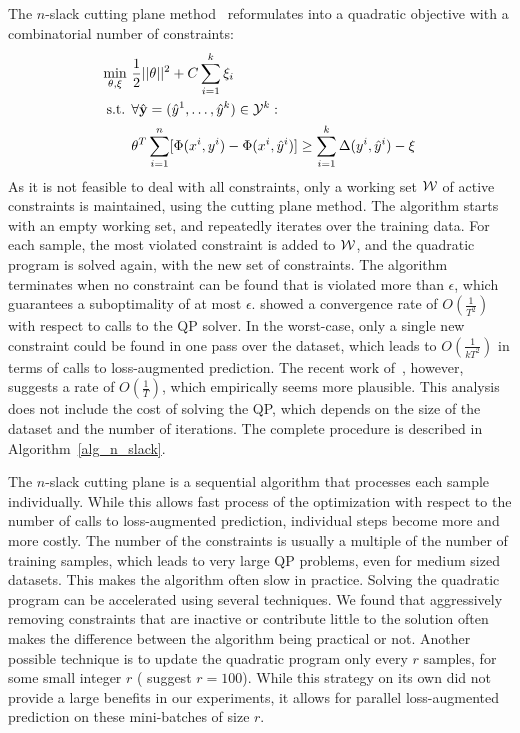 The $n$-slack cutting plane method~\citep{tsochantaridis2006large} reformulates 
into a quadratic objective with a combinatorial number of constraints:
\begin{align}\label{eq:nslack}
    \min_{\theta, \xi}\ &\frac{1}{2} ||\theta||^2 + C \sum_{i=1}^k \xi_i\\
    \text{s.t. }&\forall \hat{\mathbf{y}}=(\hat{y}^{1}, \dots, \hat{y}^{k}) \in \mathcal{Y}^k:\\
    &\theta^T \sum_{i=1}^n [\Phi(x^{i}, y^{i}) - \Phi(x^{i},
        \hat{y}^{i})] \geq \sum_{i=1}^k \Delta(y^{i}, \hat{y}^{i})
            - \xi
\end{align}
As it is not feasible to deal with all constraints, only a working set $\mathcal{W}$ of active constraints
is maintained, using the cutting plane method. The algorithm starts with an empty working set,
and repeatedly iterates over the training data. For each sample, the most
violated constraint is added to $\mathcal{W}$, and the quadratic program is solved
again, with the new set of constraints.
The algorithm terminates when no constraint can be found that is violated more than $\epsilon$,
which guarantees a suboptimality of at most $\epsilon$.
%
\citet{tsochantaridis2006large} showed a convergence rate of $O(\frac{1}{T^2})$
with respect to calls to the QP solver. In the worst-case, only a single new constraint
could be found in one pass over the dataset, which leads to $O(\frac{1}{kT^2})$ in terms
of calls to loss-augmented prediction. The recent work
of~\citet{lacoste2012block}, however, suggests a rate of $O(\frac{1}{T})$,
which empirically seems more plausible. This analysis does not include the cost
of solving the QP, which depends on the size of the dataset and the number of
iterations. 
The complete procedure is described in Algorithm~\ref{alg_n_slack}.

The $n$-slack cutting plane is a sequential algorithm that processes each sample
individually. While this allows fast process of the optimization with respect
to the number of calls to loss-augmented prediction, individual steps
become more and more costly. The number of the constraints is usually a
multiple of the number of training  samples, which leads to very large QP
problems, even for medium sized datasets. This makes the algorithm often slow
in practice.
%
Solving the quadratic program can be accelerated using several techniques. We
found that aggressively removing constraints that are inactive or contribute
little to the solution often makes the difference between the algorithm being
practical or not.  Another possible technique is to update the quadratic
program only every $r$ samples, for some small integer $r$
(\citet{joachims2009cutting} suggest $r=100$). While this strategy on its own did
not provide a large benefits in our experiments, it allows for parallel
loss-augmented prediction on these mini-batches of size $r$.


